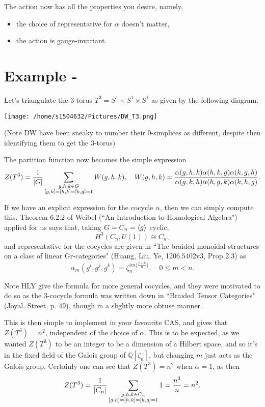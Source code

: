 \documentclass{article}
\begin{document}
The action now has all the properties you desire, namely, 
\begin{itemize}
	\item the choice of representative for $\alpha$ doesn't matter,
	\item the action is gauge-invariant.
\end{itemize}

\section{Example - }
Let's triangulate the 3-torus $T^3 = S^1 \times S^1 \times S^1$ as given by the following diagram. 

\texttt{[image: /home/s1504632/Pictures/DW\_T3.png]}

(Note DW have been sneaky to number their 0-simplices as different, despite then identifying them to get the 3-torus)

The partition function now becomes the simple expression 
\begin{align*}
	Z(T^3) = \frac{1}{\left\lvert G \right\rvert} \sum_{\substack{g, h, k \in G \\ [g,h] = [h,k] = [k,g] = 1}} W(g,h,k), \quad W(g,h,k) = \frac{\alpha(g,h,k) \alpha(h,k,g) \alpha(k,g,h)}{\alpha(g,k,h) \alpha(h,g,k) \alpha(k,h,g)}.
\end{align*}


If we have an explicit expression for the cocycle $\alpha$, then we can simply compute this. Theorem 6.2.2 of Weibel (``An Introduction to Homological Algebra") applied for us says that, taking $G = C_n = \left\langle g \right\rangle$ cyclic,
\[
H^3(C_n, U(1)) \cong C_n,
\]
and representative for the cocycles are given in ``The braided monoidal structures on a class of linear Gr-categories" (Huang, Liu, Ye, 1206.5402v3, Prop 2.3) as 
\[
\alpha_m (g^{i}, g^j, g^{k}) = \zeta_n^{im \lfloor{\frac{j+k}{n}}\rfloor}, \quad 0 \leq m < n . 
\]
\begin{remark}
	Note HLY give the formula for more general cocycles, and they were motivated to do so as the 3-cocycle formula was written down in ``Braided Tensor Categories" (Joyal, Street, p. 49), though in a slightly more obtuse manner. 
\end{remark}
 This is then simple to implement in your favourite CAS, and gives that $Z(T^3) = n^2$, independent of the choice of $\alpha$. This is to be expected, as we wanted $Z(T^3)$ to be an integer to be a dimension of a Hilbert space, and so it's in the fixed field of the Galois group of $\mathbb{Q}[\zeta_n]$, but changing $m$ just acts as the Galois group. Certainly one can see that $Z(T^3)=n^2$ when $\alpha=1$, as then 
\[
Z(T^3) = \frac{1}{\left\lvert C_n \right\rvert} \sum_{\substack{g, h, k \in C_n \\ [g,h] = [h,k] = [k,g] = 1}} 1 = \frac{n^3}{n} = n^2.
\]
\end{document}
